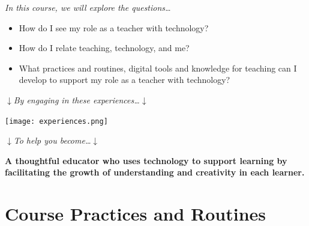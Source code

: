 \documentclass{tufte-handout}
\begin{document}
\begin{center}
	\large\textit{In this course, we will explore the questions\ldots}
\end{center}
\begin{framed}
	\small
	\begin{itemize}
		\item How do I see my role as a teacher with technology?
		\item How do I relate teaching, technology, and me?
		\item What practices and routines, digital tools and knowledge for teaching can I develop to support my role as a teacher with technology?
	\end{itemize}
\end{framed}
\begin{center}
	\large$\downarrow$\hspace{0.5em}\textit{By engaging in these experiences\ldots}\hspace{0.5em}$\downarrow$
\end{center}
\begin{framed}
	\begin{center}
		\texttt{[image: experiences.png]}
	\end{center}
\end{framed}
\begin{center}
	\large$\downarrow$\hspace{0.5em}\textit{To help you become\ldots}\hspace{0.5em}$\downarrow$
\end{center}

\begin{framed}
	\begin{center}
		\small\noindent\textbf{A thoughtful educator who uses technology to support learning by facilitating the growth of understanding and creativity in each learner.}
	\end{center}
\end{framed}

\normalsize

\newpage

\part{Course Practices and Routines}
\end{document}
